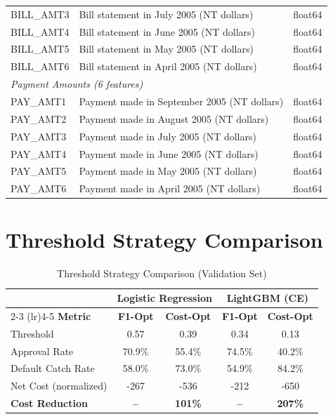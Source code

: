 \documentclass[12pt]{article}
\begin{document}
\begin{table}[H]
\begin{tabular}{lp{8cm}l}
BILL\_AMT3 & Bill statement in July 2005 (NT dollars) & float64 \\
BILL\_AMT4 & Bill statement in June 2005 (NT dollars) & float64 \\
BILL\_AMT5 & Bill statement in May 2005 (NT dollars) & float64 \\
BILL\_AMT6 & Bill statement in April 2005 (NT dollars) & float64 \\
\midrule
\multicolumn{3}{l}{\textit{Payment Amounts (6 features)}} \\
PAY\_AMT1 & Payment made in September 2005 (NT dollars) & float64 \\
PAY\_AMT2 & Payment made in August 2005 (NT dollars) & float64 \\
PAY\_AMT3 & Payment made in July 2005 (NT dollars) & float64 \\
PAY\_AMT4 & Payment made in June 2005 (NT dollars) & float64 \\
PAY\_AMT5 & Payment made in May 2005 (NT dollars) & float64 \\
PAY\_AMT6 & Payment made in April 2005 (NT dollars) & float64 \\
\bottomrule
\end{tabular}
\end{table}

\section{Threshold Strategy Comparison}\label{app:threshold_table}

\begin{table}[H]
\centering
\caption{Threshold Strategy Comparison (Validation Set)}
\label{tab:threshold_comparison_appendix}
\small
\begin{tabular}{lcccc}
\toprule
& \multicolumn{2}{c}{\textbf{Logistic Regression}} & \multicolumn{2}{c}{\textbf{LightGBM (CE)}} \\
\cmidrule(lr){2-3} \cmidrule(lr){4-5}
\textbf{Metric} & \textbf{F1-Opt} & \textbf{Cost-Opt} & \textbf{F1-Opt} & \textbf{Cost-Opt} \\
\midrule
Threshold & 0.57 & 0.39 & 0.34 & 0.13 \\
Approval Rate & 70.9\% & 55.4\% & 74.5\% & 40.2\% \\
Default Catch Rate & 58.0\% & 73.0\% & 54.9\% & 84.2\% \\
Net Cost (normalized) & -267 & -536 & -212 & -650 \\
\textbf{Cost Reduction} & \textbf{--} & \textbf{101\%} & \textbf{--} & \textbf{207\%} \\
\bottomrule
\end{tabular}
\end{table}
\end{document}
